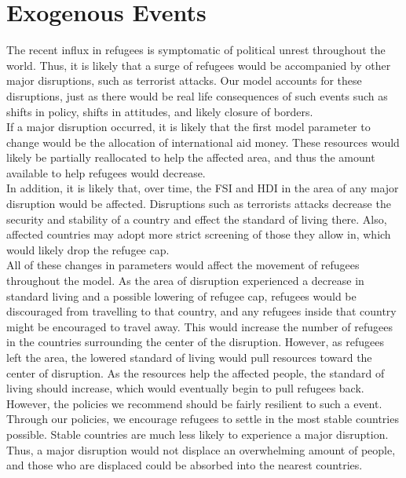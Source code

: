\documentclass{article}
\begin{document}
\section{Exogenous Events}
The recent influx in refugees is symptomatic of political unrest throughout the world. Thus, it is likely that a surge of refugees would be accompanied by other major disruptions, such as terrorist attacks. Our model accounts for these disruptions, just as there would be real life consequences of such events such as shifts in policy, shifts in attitudes, and likely closure of borders. \\
If a major disruption occurred, it is likely that the first model parameter to change would be the allocation of international aid money. These resources would likely be partially reallocated to help the affected area, and thus the amount available to help refugees would decrease. \\
In addition, it is likely that, over time, the FSI and HDI in the area of any major disruption would be affected. Disruptions such as terrorists attacks decrease the security and stability of a country and effect the standard of living there. Also, affected countries may adopt more strict screening of those they allow in, which would likely drop the refugee cap.  \\
All of these changes in parameters would affect the movement of refugees throughout the model. As the area of disruption experienced a decrease in standard living and a possible lowering of refugee cap, refugees would be discouraged from travelling to that country, and any refugees inside that country might be encouraged to travel away. This would increase the number of refugees in the countries surrounding the center of the disruption. However, as refugees left the area, the lowered standard of living would pull resources toward the center of disruption. As the resources help the affected people, the standard of living should increase, which would eventually begin to pull refugees back. \\
However, the policies we recommend should be fairly resilient to such a event. Through our policies, we encourage refugees to settle in the most stable countries possible. Stable countries are much less likely to experience a major disruption. Thus, a major disruption would not displace an overwhelming amount of people, and those who are displaced could be absorbed into the nearest countries.
\end{document}
